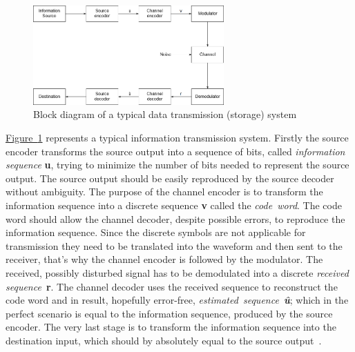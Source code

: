 \documentclass[]{myclass}
\begin{document}
\begin  {figure}  [H]
\centering
\includegraphics[width=0.65\textwidth]{figures/Data_transmission_path.png}
\caption{Block diagram of a typical data transmission (storage) system~\cite{book:LinCostello}}
\label{fig:data_path}
\end {figure}

\noindent\hyperref[fig:data_path]{Figure~\ref*{fig:data_path}} represents a typical information transmission system. Firstly the source encoder transforms the source output into a sequence of bits, called \textit{information sequence} \textbf{u}, trying to minimize the number of bits needed to represent the source output. The source output should be easily reproduced by the source decoder without ambiguity. The purpose of the channel encoder is to transform the information sequence into a discrete sequence \textbf{v} called the \textit{code~word}. The code word should allow the channel decoder, despite possible errors, to reproduce the information sequence. Since the discrete symbols are not applicable for transmission they need to be translated into the waveform and then sent to the receiver, that's why the channel encoder is followed by the modulator. The received, possibly disturbed signal has to be demodulated into a discrete \textit{received sequence}~\textbf{r}. The channel decoder uses the received sequence to reconstruct the code word and in result, hopefully error-free, \textit{estimated~sequence~\textbf{\^{u}}}; which in the perfect scenario is equal to the information sequence, produced by the source encoder. The very last stage is to transform the information sequence into the destination input, which should by absolutely equal to the source output~\cite{book:LinCostello}.\\
\end{document}
